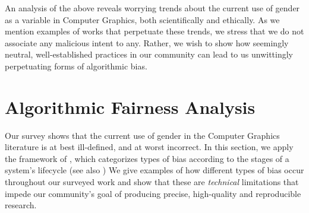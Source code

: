 \documentclass[nonacm,sigconf,review,balance=false]{acmart}
\begin{document}
An analysis of the above reveals worrying trends about the current use of gender
as a variable in Computer Graphics, both scientifically and ethically. As we
mention examples of works that perpetuate these trends, we stress that we do not
associate any malicious intent to any. Rather, we wish to show how seemingly
neutral, well-established practices in our community can lead to us unwittingly
perpetuating forms of algorithmic bias.

\vspace{-0.1cm}
\section{Algorithmic Fairness Analysis}

Our survey shows that the current use of gender in the Computer Graphics literature is at best ill-defined, and at worst incorrect.
In this section,
we apply the framework of \citet{Suresh2021}, which categorizes types of bias according to the stages of a system's lifecycle 
(see also \cite{fairnesssurvey,FriedmanAndNissenbaum,olteanu2019social})
We give examples of how different types of bias occur throughout our surveyed work and show that these are \emph{technical} limitations that impede our community's goal of producing precise, high-quality and reproducible research.
\end{document}
